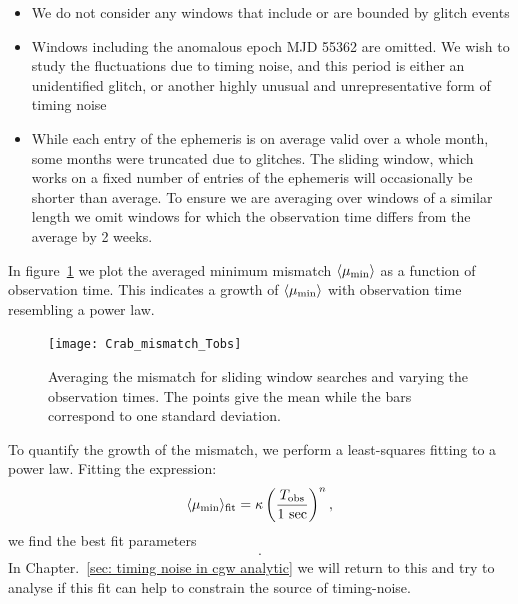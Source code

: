 \documentclass[../full_thesis/full_thesis.tex]{subfiles}
\newcommand{\thisdir}{../timing_noise_in_CGW}
\begin{document}
\begin{itemize}
    \item We do not consider any windows that
    include or are bounded by glitch events

    \item Windows including the anomalous epoch MJD 55362 are omitted. We
    wish to study the fluctuations due to timing noise, and this
    period is either an unidentified glitch, or another highly unusual and
    unrepresentative form of timing noise

   \item While each entry of the ephemeris is on average valid over a whole
   month, some months were truncated due to glitches. The sliding window, which
   works on a fixed number of entries of the ephemeris will occasionally be
   shorter than average. To ensure we are averaging over windows of a
   similar length we omit windows for which the observation time differs from
   the average by 2 weeks.

\end{itemize}

In figure~\ref{fig: mismatch Tobs} we plot the averaged minimum
mismatch $\langle\mu_{\mathrm{min}}\rangle$ as a function of observation time.
This indicates a growth of $\langle\mu_{\mathrm{min}}\rangle$ with observation time
resembling a power law.
\begin{figure}[ht]
\centering
\texttt{[image: Crab\_mismatch\_Tobs]}
\caption{Averaging the mismatch for sliding window searches and varying the
observation times. The points give the mean while the bars correspond to one
standard deviation.}
\label{fig: mismatch Tobs}
\end{figure}

To quantify the growth of the mismatch, we perform a least-squares fitting
to a power law. Fitting the expression:
\begin{equation}
\langle\mu_{\mathrm{min}}\rangle_{\textrm{fit}} = \kappa
                                   \left(\frac{T_{\textrm{obs}}}{1\textrm{ sec}}\right)^{n},
\end{equation}
we find the best fit parameters
\begin{align}
    .
    \label{eqn: fit values}
\end{align}
In Chapter.~\ref{sec: timing noise in cgw analytic} we will return to this
and try to analyse if this fit can help to constrain the source of timing-noise.
\end{document}
